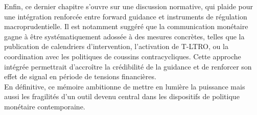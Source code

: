 Enfin, ce dernier chapitre s’ouvre sur une discussion normative, qui plaide pour une intégration renforcée entre forward guidance et instruments de régulation macroprudentielle. Il est notamment suggéré que la communication monétaire gagne à être systématiquement adossée à des mesures concrètes, telles que la publication de calendriers d’intervention, l’activation de T-LTRO, ou la coordination avec les politiques de coussins contracycliques. Cette approche intégrée permettrait d’accroître la crédibilité de la guidance et de renforcer son effet de signal en période de tensions financières.\\

En définitive, ce mémoire ambitionne de mettre en lumière la puissance mais aussi les fragilités d’un outil devenu central dans les dispositifs de politique monétaire contemporaine.


